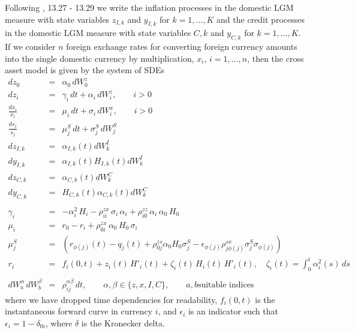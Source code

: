 \documentclass[12pt, a4paper]{article}
\begin{document}
{{\begin{appendix}
Following \cite{Lichters}, 13.27 - 13.29 we write the inflation processes 
in the domestic LGM measure with state variables $z_{I,k}$ and $y_{I,k}$ for $k=1,\ldots,K$
and the credit processes in the domestic LGM measure with state variables ${C,k}$ and $y_{C,k}$ for $k=1,\ldots,K$.
If we consider $n$ 
foreign exchange rates for converting foreign currency amounts into the single domestic currency by multiplication, 
$x_i$, $i=1,\dots,n$, then the cross asset model is given by the system of SDEs
\begin{eqnarray*}
dz_0 &=& \alpha_0\,dW_0^z \\
dz_i &=& \gamma_i\,dt + \alpha_i\,dW_i^z,  \qquad i>0 \\
\frac{d x_i}{x_i} &=& \mu_i\, dt + \sigma_i\,dW_i^x, \qquad i > 0 \\
\frac{d s_j}{s_j} &=& \mu_j^S\, dt + \sigma_j^S\,dW_j^S \\
dz_{I,k} &=& \alpha_{I,k}(t)dW_k^I \\
dy_{I,k} &=& \alpha_{I,k}(t)H_{I,k}(t)dW_k^I \\
dz_{C,k} &=& \alpha_{C,k}(t)dW_k^C \\
dy_{C,k} &=& H_{C,k}(t)\alpha_{C,k}(t)dW_k^C \\ \\
\gamma_i &=&
-\alpha_i^2\,H_i -\rho_{ii}^{zx}\,\sigma_i\,\alpha_i + \rho_{i0}^{zz}\,\alpha_i\,\alpha_0\,H_0\\
\mu_i &=& r_0 - r_i + \rho_{0i}^{zx}\,\alpha_0\,H_0\,\sigma_i\\
\mu_j^S &=& (r_{\phi(j)}(t) - q_j(t) + \rho_{0j}^{zs} \alpha_0 H_0 \sigma_j^S - \epsilon_{\phi(j)}
\rho_{j \phi(j)}^{sx}\sigma_j^S \sigma_{\phi(j)}) \\
r_i &=& f_i(0,t) + z_i(t)\,H'_i(t) + \zeta_i(t)\,H_i(t)\,H'_i(t),
\quad \zeta_i(t) = \int_0^t \alpha_i^2(s)\,ds  \\ \\
dW^\alpha_a\,dW^\beta_b &=& \rho^{\alpha\beta}_{ij}\,dt, \qquad \alpha, \beta \in \{z, x, I, C\}, \qquad a, b \text{
                              suitable indices }
\end{eqnarray*}
where we have dropped time dependencies for readability, $f_i(0,t)$ is the instantaneous forward curve in currency $i$, 
and $\epsilon_i$ is an indicator such that $\epsilon_i = 1 - \delta_{0i}$, where $\delta$ is the Kronecker delta.


\end{appendix}}}
\end{document}
